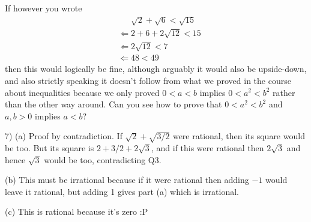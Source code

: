 \documentclass[10pt]{article}
\begin{document}
If however you wrote
\begin{align*}
&\phantom{\Leftarrow}\sqrt{2}+\sqrt{6}<\sqrt{15}\\
&\Leftarrow2+6+2\sqrt{12}<15\\
&\Leftarrow2\sqrt{12}<7\\
&\Leftarrow48<49
\end{align*}
then this would logically be fine, although arguably it would also be upside-down, and also strictly speaking it doesn't follow from what we proved in the course about inequalities because we only proved $0<a<b$ implies $0<a^2<b^2$ rather than the other way around. Can you see how to prove that $0<a^2<b^2$ and $a,b>0$ implies $a<b$?

\medskip

7) (a) Proof by contradiction. If $\sqrt{2}+\sqrt{3/2}$ were rational, then its square would be too. But its square is $2+3/2+2\sqrt{3}$, and if this were rational then $2\sqrt{3}$ and hence $\sqrt{3}$ would be too, contradicting Q3.

(b) This must be irrational because if it were rational then adding $-1$ would leave it rational, but adding 1 gives part (a) which is irrational.

(c) This is rational because it's zero :P
\end{document}

